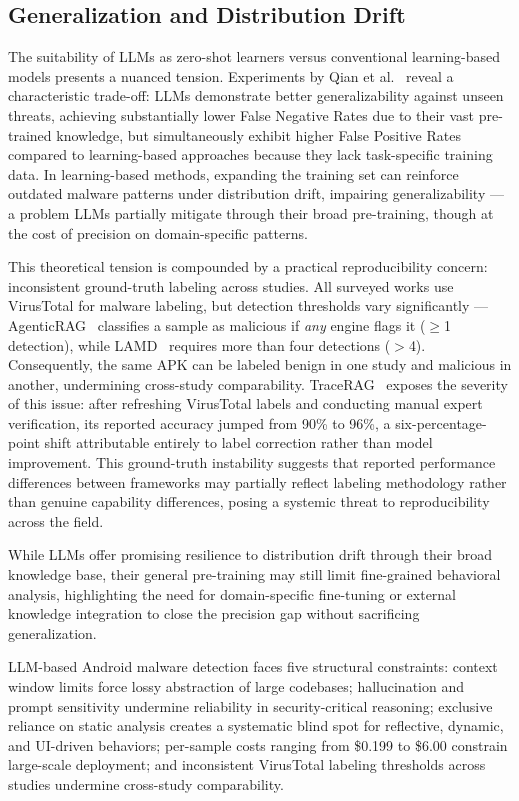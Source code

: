 \subsection{Generalization and Distribution Drift}

The suitability of LLMs as zero-shot learners versus conventional learning-based models presents a nuanced tension. Experiments by Qian et al.~\cite{Qian2025-ua} reveal a characteristic trade-off: LLMs demonstrate better generalizability against unseen threats, achieving substantially lower False Negative Rates due to their vast pre-trained knowledge, but simultaneously exhibit higher False Positive Rates compared to learning-based approaches because they lack task-specific training data. In learning-based methods, expanding the training set can reinforce outdated malware patterns under distribution drift, impairing generalizability --- a problem LLMs partially mitigate through their broad pre-training, though at the cost of precision on domain-specific patterns.

This theoretical tension is compounded by a practical reproducibility concern: inconsistent ground-truth labeling across studies. All surveyed works use VirusTotal for malware labeling, but detection thresholds vary significantly --- AgenticRAG~\cite{S2025-kj} classifies a sample as malicious if \textit{any} engine flags it ($\geq$1 detection), while LAMD~\cite{Qian2025-ua} requires more than four detections ($>$4). Consequently, the same APK can be labeled benign in one study and malicious in another, undermining cross-study comparability. TraceRAG~\cite{Zhang2025-ot} exposes the severity of this issue: after refreshing VirusTotal labels and conducting manual expert verification, its reported accuracy jumped from 90\% to 96\%, a six-percentage-point shift attributable entirely to label correction rather than model improvement. This ground-truth instability suggests that reported performance differences between frameworks may partially reflect labeling methodology rather than genuine capability differences, posing a systemic threat to reproducibility across the field.

While LLMs offer promising resilience to distribution drift through their broad knowledge base, their general pre-training may still limit fine-grained behavioral analysis, highlighting the need for domain-specific fine-tuning or external knowledge integration to close the precision gap without sacrificing generalization.

\begin{tcolorbox}[
    title=\textbf{RQ3 -- Key Takeaways},
    colback=white,
    colframe=blue!60!black,
    colbacktitle=blue!60!black,
    fonttitle=\bfseries\color{white},
    boxrule=0.5pt
]
LLM-based Android malware detection faces five structural constraints: context window limits force lossy abstraction of large codebases; hallucination and prompt sensitivity undermine reliability in security-critical reasoning; exclusive reliance on static analysis creates a systematic blind spot for reflective, dynamic, and UI-driven behaviors; per-sample costs ranging from \$0.199 to \$6.00 constrain large-scale deployment; and inconsistent VirusTotal labeling thresholds across studies undermine cross-study comparability.
\end{tcolorbox}
